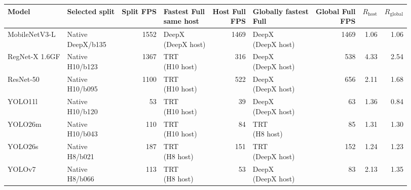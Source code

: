 \begin{tabular}{l l r l r l r r r}
\toprule
Model & Selected split & Split FPS & \shortstack{Fastest Full\\same host} & \shortstack{Host Full\\FPS} & \shortstack{Globally fastest\\Full} & \shortstack{Global Full\\FPS} & $R_{\mathrm{host}}$ & $R_{\mathrm{global}}$ \\
\midrule
MobileNetV3-L & \shortstack[l]{Native\\DeepX/b135} & 1552 & \shortstack[l]{DeepX\\(DeepX host)} & 1469 & \shortstack[l]{DeepX\\(DeepX host)} & 1469 & 1.06 & 1.06 \\
RegNet-X 1.6GF & \shortstack[l]{Native\\H10/b123} & 1367 & \shortstack[l]{TRT\\(H10 host)} & 316 & \shortstack[l]{DeepX\\(DeepX host)} & 538 & 4.33 & 2.54 \\
ResNet-50 & \shortstack[l]{Native\\H10/b095} & 1100 & \shortstack[l]{TRT\\(H10 host)} & 522 & \shortstack[l]{DeepX\\(DeepX host)} & 656 & 2.11 & 1.68 \\
YOLO11l & \shortstack[l]{Native\\H10/b120} & 53 & \shortstack[l]{TRT\\(H10 host)} & 39 & \shortstack[l]{DeepX\\(DeepX host)} & 63 & 1.36 & 0.84 \\
YOLO26m & \shortstack[l]{Native\\H10/b043} & 110 & \shortstack[l]{TRT\\(H10 host)} & 84 & \shortstack[l]{TRT\\(H8 host)} & 85 & 1.31 & 1.30 \\
YOLO26s & \shortstack[l]{Native\\H8/b021} & 187 & \shortstack[l]{TRT\\(H8 host)} & 151 & \shortstack[l]{TRT\\(DeepX host)} & 152 & 1.24 & 1.23 \\
YOLOv7 & \shortstack[l]{Native\\H8/b066} & 113 & \shortstack[l]{TRT\\(H8 host)} & 53 & \shortstack[l]{DeepX\\(DeepX host)} & 83 & 2.13 & 1.35 \\
\bottomrule
\end{tabular}
\endgroup

